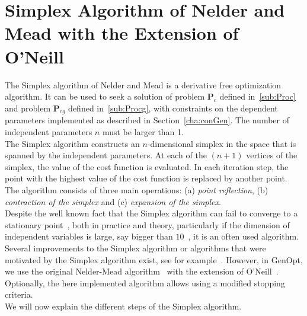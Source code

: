 \section[Simplex Algorithm of Nelder and Mead]{Simplex Algorithm of Nelder and Mead with the Extension of O'Neill}

The Simplex algorithm of Nelder and Mead is a derivative free optimization algorithm.
It can be used to seek a solution of problem $\mathbf P_c$ defined in~\eqref{sub:Proc} 
and problem $\mathbf P_{cg}$ defined in~\eqref{sub:Procg},
with constraints on the dependent parameters implemented as 
described in Section~\ref{cha:conGen}.
The number of independent parameters $n$ must be larger than 1.\\

The Simplex algorithm constructs an $n$-dimensional simplex
in the space that is spanned by the independent parameters.
At each of the $(n+1)$ vertices of the simplex, the value of the cost function is evaluated. In each iteration step, the point with the highest value of the cost function is replaced by another point. The algorithm consists of three main operations: (a) \emph{point reflection}, (b) \emph{contraction of the simplex} and (c) \emph{expansion of the simplex}.\\


Despite the well known fact 
that the Simplex algorithm can fail to converge to a stationary 
point~\cite{Kelley1999:2,Torczon1989,Kelley1999:1,Wright1996,McKinnon1998,Lagarias1998}, both in practice and theory,
particularly if the dimension of independent variables is large, 
say bigger than $10$~\cite{Torczon1989}, it is an often used algorithm.
Several improvements to the Simplex algorithm
or algorithms that were motivated by the Simplex algorithm exist,
see for example~\cite{Kelley1999:2,Torczon1989,Kelley1999:1,Tseng1999}.
However, in GenOpt, we use the original Nelder-Mead algorithm~\cite{NelderMea1965}
with the extension of O'Neill~\cite{ONeill1971}.
Optionally, the here implemented algorithm allows using
a modified stopping criteria.\\

We will now explain the different steps of the Simplex algorithm.


